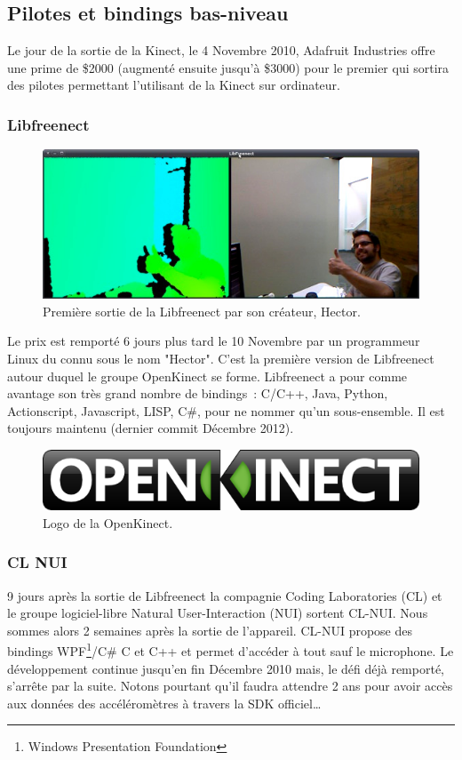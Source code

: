 \documentclass[french,12pt]{report}
\begin{document}
  \subsection{Pilotes et bindings bas-niveau}
  Le jour de la sortie de la Kinect, le 4 Novembre 2010, Adafruit Industries 
  offre une prime de \$2000 (augmenté ensuite jusqu'à \$3000) pour le premier qui
  sortira des pilotes permettant l'utilisant de la Kinect sur ordinateur.
  \subsubsection{Libfreenect}
  \begin{figure}[h!]
  \centering
  \includegraphics[width=\linewidth]{images/hector}
  \caption{Première sortie de la Libfreenect par son créateur, Hector.}
  \end{figure}
  Le prix est remporté 6 jours plus tard le 10 Novembre par un programmeur Linux
  du connu sous le nom "Hector". C'est la première version de Libfreenect autour
  duquel le groupe OpenKinect se forme. Libfreenect a pour comme avantage son
  très grand nombre de bindings~: C/C++, Java, Python, Actionscript, Javascript,
  LISP, C\#, pour ne nommer qu'un sous-ensemble. 
  Il est toujours maintenu (dernier commit Décembre 2012).
  \begin{figure}[h!]
  \centering
  \includegraphics[width=0.5\linewidth]{images/openkinect_logo}
  \caption{Logo de la OpenKinect.}
  \end{figure}
  \subsubsection{CL NUI}
  9 jours après la sortie de Libfreenect la compagnie Coding Laboratories 
  (CL) et le groupe logiciel-libre
  Natural User-Interaction (NUI) sortent CL-NUI. Nous sommes alors 2 semaines 
  après la sortie de l'appareil. CL-NUI propose des bindings 
  WPF\footnote{Windows Presentation Foundation}/C\# C et C++ et permet d'accéder 
  à tout sauf le microphone. Le développement continue jusqu'en fin Décembre 2010 
  mais,
  le défi déjà remporté, s'arrête par la suite. Notons pourtant qu'il faudra 
  attendre 2 ans pour avoir accès aux données des accéléromètres à travers la 
  SDK officiel\ldots
\end{document}
